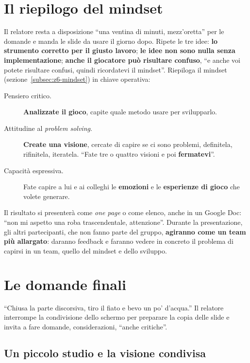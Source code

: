 \section{Il riepilogo del mindset}
\label{sec:z6-riepilogo}

Il relatore resta a disposizione ``una ventina di minuti, mezz'oretta'' per le
domande e manda le slide da usare il giorno dopo. Ripete le tre idee:
\textbf{lo strumento corretto per il giusto lavoro}; \textbf{le idee non sono
nulla senza implementazione}; \textbf{anche il giocatore può risultare confuso},
``e anche voi potete risultare confusi, quindi ricordatevi il mindset''.
Riepiloga il mindset (sezione~\ref{subsec:z6-mindset}) in chiave operativa:
\begin{description}
  \item[Pensiero critico.] \textbf{Analizzate il gioco}, capite quale metodo usare
        per svilupparlo.
  \item[Attitudine al \emph{problem solving}.] \textbf{Create una visione},
        cercate di capire se ci sono problemi, definitela, rifinitela, iteratela.
        ``Fate tre o quattro visioni e poi \textbf{fermatevi}''.
  \item[Capacità espressiva.] Fate capire a lui e ai colleghi le
        \textbf{emozioni} e le \textbf{esperienze di gioco} che volete generare.
\end{description}
Il risultato si presenterà come \emph{one page} o come elenco, anche in un Google
Doc: ``non mi aspetto una roba trascendentale, attenzione''. Durante la
presentazione, gli altri partecipanti, che non fanno parte del gruppo,
\textbf{agiranno come un team più allargato}: daranno feedback e faranno vedere
in concreto il problema di capirsi in un team, quello del mindset e dello
sviluppo.

\section{Le domande finali}
\label{sec:z6-domande-finali}

``Chiusa la parte discorsiva, tiro il fiato e bevo un po' d'acqua.'' Il relatore
interrompe la condivisione dello schermo per preparare la copia delle slide e
invita a fare domande, considerazioni, ``anche critiche''.

\subsection{Un piccolo studio e la visione condivisa}

